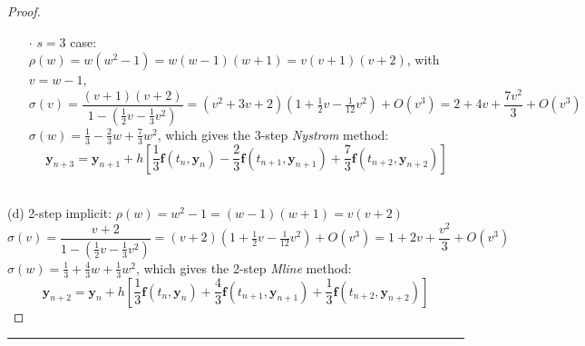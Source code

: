 \documentclass[a4paper, 10pt]{article}
\theoremstyle{definition}
\theoremstyle{hSol}
\begin{document}
\begin{proof}
\begin{itemize}
  \item[$\cdot$] $s=3$ case: $\rho(w)=w(w^2-1)=w(w-1)(w+1)=v(v+1)(v+2)$, with $v=w-1$,
  $$
  \sigma(v) = \frac{(v+1)(v + 2)}{1-(\frac{1}{2}v-\frac{1}{3}v^2)} = (v^2+3v+2)(1+\tfrac{1}{2}v-\tfrac{1}{12}v^2)+O(v^3)  = 2+4v+\frac{7 v^2}{3}+O(v^3)
  $$
  $\sigma(w)=\frac{1}{3}-\frac{2}{3}w+\frac{7}{3}w^2$, which gives the 3-step \emph{Nystrom} method:
  \begin{equation}
    \bm{y}_{n+3}=\bm{y}_{n+1} + h\left[\frac{1}{3}\bm{f}(t_{n}, \bm{y}_{n})-\frac{2}{3}\bm{f}(t_{n+1}, \bm{y}_{n+1})+\frac{7}{3}\bm{f}(t_{n+2}, \bm{y}_{n+2})\right]
  \end{equation}
\end{itemize}

~\\
(d) 2-step implicit: $\rho(w)=w^2-1=(w-1)(w+1)=v(v+2)$
$$
  \sigma(v) = \frac{v + 2}{1-(\frac{1}{2}v-\frac{1}{3}v^2)} = (v+2)(1+\tfrac{1}{2}v-\tfrac{1}{12}v^2)+O(v^3)  = 1+2v+\frac{v^2}{3}+O(v^3)
$$
$\sigma(w)=\frac{1}{3}+\frac{4}{3}w+\frac{1}{3}w^2$, which gives the 2-step \emph{Mline} method:
  \begin{equation}
    \bm{y}_{n+2}=\bm{y}_{n} + h\left[\frac{1}{3}\bm{f}(t_{n}, \bm{y}_{n})+\frac{4}{3}\bm{f}(t_{n+1}, \bm{y}_{n+1})+\frac{1}{3}\bm{f}(t_{n+2}, \bm{y}_{n+2})\right]
  \end{equation}
\end{proof} 







\noindent\rule{16cm}{0.4pt}
\end{document}
